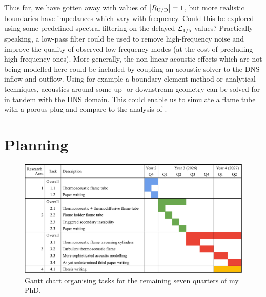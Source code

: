 Thus far, we have gotten away with values of $\abs{R_{\mathrm{U}/\mathrm{D}}} = 1$, but more realistic boundaries have impedances which vary with frequency. Could this be explored using some predefined spectral filtering on the delayed $\mathcal{L}_{1/5}$ values? Practically speaking, a low-pass filter could be used to remove high-frequency noise and improve the quality of observed low frequency modes (at the cost of precluding high-frequency ones). More generally, the non-linear acoustic effects which are not being modelled here could be included by coupling an acoustic solver to the DNS inflow and outflow. Using for example a boundary element method or analytical techniques, acoustics around some up- or downstream geometry can be solved for in tandem with the DNS domain. This could enable us to simulate a flame tube with a porous plug and compare to the analysis of \cite{gaton-perez2025MitigationThermoacousticInstabilities}.



\section{Planning}

\begin{figure}[t]
\centering
\includegraphics[scale=0.5]{assets/graphs/2YR_Gantt.pdf}
\caption{Gantt chart organising tasks for the remaining seven quarters of my PhD.}
\label{fig:gantt}
\end{figure}


